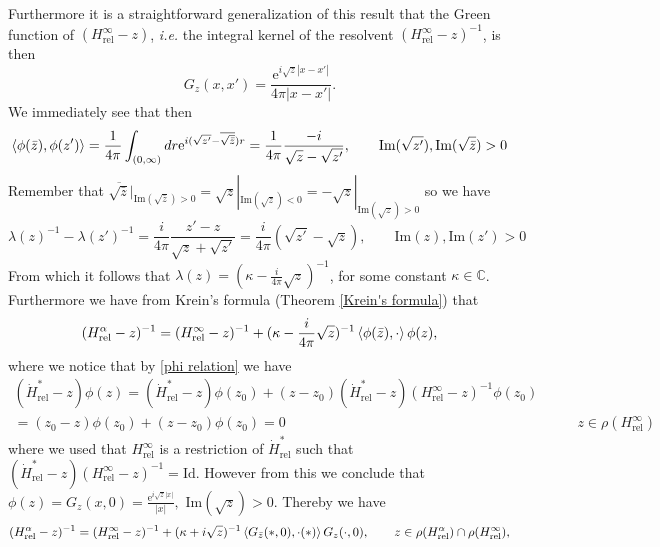 \documentclass[a4paper,11pt]{article}
\newcommand{\euler}[1]{\text{e}^{#1}}
\newcommand{\Imag}{\text{Im}}
\newcommand{\ie}{\emph{i.e.} }
\newcommand{\C}{\mathbb{C}}
\numberwithin{equation}{section}
\begin{document}
Furthermore it is a straightforward generalization of this result that the Green function of $ (H_{\text{rel}}^\infty-z) $, \ie the integral kernel of the resolvent $ (H_{\text{rel}}^\infty-z)^{-1} $, is then \begin{equation}
G_z(x,x')=\frac{\euler{i\sqrt{z}|x-x'|}}{4\pi|x-x'|}.
\end{equation}
We immediately see that then\begin{equation}
\braket{\phi(\bar{z}),\phi(z')}=\frac{1}{4\pi}\int_{(0,\infty)}dr\euler{i(\sqrt{z'}-\overline{\sqrt{\bar{z}}})r}=\frac{1}{4\pi}\frac{-i}{\sqrt{z}-\sqrt{z'}},\qquad \Imag(\sqrt{z'}),\Imag(\sqrt{\bar{z}})>0
\end{equation}
Remember that $ \overline{\sqrt{\bar{z}}}\rvert_{\Imag(\sqrt{\bar{z}})>0}=\sqrt{z}|_{\Imag(\sqrt{z})<0}=-\sqrt{z}|_{\Imag(\sqrt{z})>0} $
so we have \begin{equation}
\lambda(z)^{-1}-\lambda(z')^{-1}=\frac{i}{4\pi}\frac{z'-z}{\sqrt{z}+\sqrt{z'}}=\frac{i}{4\pi}(\sqrt{z'}-\sqrt{z}),\qquad \Imag(z),\Imag(z')>0
\end{equation}
From which it follows that $ \lambda(z)=(\kappa-\frac{i}{4\pi}\sqrt{z})^{-1} $, for some constant $ \kappa\in\C $. Furthermore we have from Krein's formula (Theorem \ref{Krein's formula}) that \begin{equation}
(H_{\text{rel}}^\alpha-z)^{-1}=(H_{\text{rel}}^\infty-z)^{-1}+(\kappa-\frac{i}{4\pi}\sqrt{z})^{-1}\braket{\phi(\bar{z}),\cdot}\phi(z),
\end{equation}
where we notice that by \eqref{phi relation} we have\begin{equation}
\begin{aligned}
(\dot{H}_{\text{rel}}^*-z)\phi(z)=(\dot{H}_{\text{rel}}^*-z)\phi(z_0)+(z-z_0)(\dot{H}_{\text{rel}}^*-z)(H_{\text{rel}}^\infty-z)^{-1}\phi(z_0)&\\
=(z_0-z)\phi(z_0)+(z-z_0)\phi(z_0)=0&\qquad z\in\rho(H_{\text{rel}}^\infty)
\end{aligned}
\end{equation}
where we used that $ H_{\text{rel}}^\infty $ is a restriction of $ \dot{H}_{\text{rel}}^* $ such that $ (\dot{H}_{\text{rel}}^*-z)(H_{\text{rel}}^\infty-z)^{-1}=\text{Id} $. However from this we conclude that $ \phi(z)=G_{z}(x,0)=\frac{\euler{i\sqrt{z}|x|}}{|x|}, $ $ \Imag(\sqrt{z})>0 $. Thereby we have \begin{equation}
(H_{\text{rel}}^\alpha-z)^{-1}=(H_{\text{rel}}^\infty-z)^{-1}+(\kappa+i\sqrt{z})^{-1}\braket{G_{\bar{z}}(\ast,0),\cdot(\ast)}G_z(\cdot,0),\qquad z\in\rho(H_{\text{rel}}^\alpha)\cap\rho(H_{\text{rel}}^\infty),
\end{equation}
\end{document}
